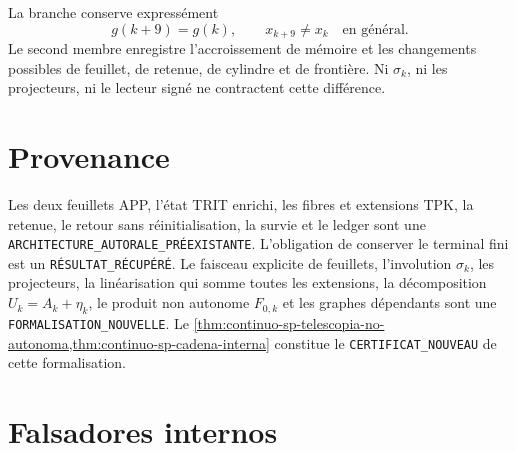La branche conserve expressément
\begin{equation}
\label{eq:continuo-sp-no-reset}
 g(k+9)=g(k),
 \qquad
 x_{k+9}\neq x_k\quad\text{en général}.
\end{equation}
Le second membre enregistre l'accroissement de mémoire et les changements possibles
de feuillet, de retenue, de cylindre et de frontière. Ni \(\sigma_k\), ni les projecteurs, ni
le lecteur signé ne contractent cette différence.

\iffalse
\section{Provenance}

Les deux feuillets APP, l'état TRIT enrichi, les fibres et extensions TPK,
la retenue, le retour sans réinitialisation, la survie et le ledger sont une
\texttt{ARCHITECTURE\_AUTORALE\_PRÉEXISTANTE}. L'obligation de conserver le
terminal fini est un \texttt{RÉSULTAT\_RÉCUPÉRÉ}. Le faisceau explicite de feuillets,
l'involution \(\sigma_k\), les projecteurs, la linéarisation qui somme toutes
les extensions, la décomposition \(U_k=A_k+\eta_k\), le produit non
autonome \(F_{0,k}\) et les graphes dépendants sont une
\texttt{FORMALISATION\_NOUVELLE}. Le
\cref{thm:continuo-sp-telescopia-no-autonoma,thm:continuo-sp-cadena-interna}
constitue le \texttt{CERTIFICAT\_NOUVEAU} de cette formalisation.

\section{Falsadores internos}

